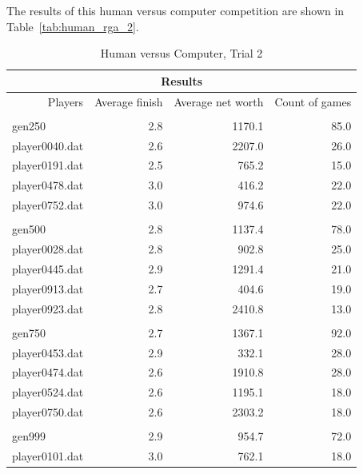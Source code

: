The results of this human versus computer competition are shown in
Table~\ref{tab:human_rga_2}.

\begin{table}[htbp]
  \centering
  \caption{Human versus Computer, Trial 2}
    \begin{tabular}{r|rrr}
    \toprule
    \multicolumn{4}{c}{Results} \\
    \midrule
          Players & Average finish & Average net worth & Count of games
    \\ \\
    \multicolumn{1}{l|}{gen250} & 2.8    & 1170.1 & 85.0 \\
    \hline
    \multicolumn{1}{l|}{player0040.dat} & 2.6    & 2207.0 & 26.0 \\
    \multicolumn{1}{l|}{player0191.dat} & 2.5    & 765.2  & 15.0 \\
    \multicolumn{1}{l|}{player0478.dat} & 3.0    & 416.2  & 22.0 \\
    \multicolumn{1}{l|}{player0752.dat} & 3.0    & 974.6  & 22.0 \\ \\
    \multicolumn{1}{l|}{gen500} & 2.8    & 1137.4 & 78.0 \\
    \hline
    \multicolumn{1}{l|}{player0028.dat} & 2.8    & 902.8  & 25.0 \\
    \multicolumn{1}{l|}{player0445.dat} & 2.9    & 1291.4 & 21.0 \\
    \multicolumn{1}{l|}{player0913.dat} & 2.7    & 404.6  & 19.0 \\
    \multicolumn{1}{l|}{player0923.dat} & 2.8    & 2410.8 & 13.0 \\ \\
    \multicolumn{1}{l|}{gen750} & 2.7    & 1367.1 & 92.0 \\
    \hline
    \multicolumn{1}{l|}{player0453.dat} & 2.9    & 332.1  & 28.0 \\
    \multicolumn{1}{l|}{player0474.dat} & 2.6    & 1910.8 & 28.0 \\
    \multicolumn{1}{l|}{player0524.dat} & 2.6    & 1195.1 & 18.0 \\
    \multicolumn{1}{l|}{player0750.dat} & 2.6    & 2303.2 & 18.0 \\ \\
    \multicolumn{1}{l|}{gen999} & 2.9    & 954.7  & 72.0 \\
    \hline
    \multicolumn{1}{l|}{player0101.dat} & 3.0    & 762.1  & 18.0 \\

\end{tabular}
\end{table}
